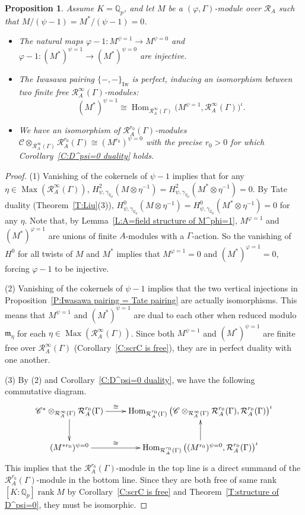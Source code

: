 \documentclass[12pt]{article}
\newtheorem{prop}[theorem]{Proposition}
\theoremstyle{definition}
\numberwithin{equation}{theorem}
\newcommand{\calR}{\mathcal{R}}
\newcommand{\gothm}{\mathfrak{m}}
\newcommand{\QQ}{\mathbb{Q}}
\newcommand{\scrC}{\mathscr{C}}
\newcommand{\Iw}{\mathrm{Iw}}
\def\Qp{\QQ_p}
\DeclareMathOperator{\Hom}{Hom}
\DeclareMathOperator{\Max}{Max}
\DeclareMathOperator{\rank}{rank}
\begin{document}
\begin{prop}
\label{P:Iwasawa pairing over fields}
Assume $K=\Qp$, and let $M$ be a $(\varphi, \Gamma)$-module over
$\calR_A$ such that $M / (\psi -1) = M^*/(\psi-1) = 0$.
\begin{itemize}
\item[(1)] The natural maps $\varphi-1: M^{\psi=1} \to M^{\psi=0}$ and $\varphi-1: (M^*)^{\psi=1} \to (M^*)^{\psi=0}$ are injective.
\item[(2)] The Iwasawa pairing $\{-,-\}_\Iw$ is perfect, inducing an isomorphism between two finite free $\calR_A^\infty(\Gamma)$-modules:
\[
(M^*)^{\psi =1} \cong \Hom_{\calR_A^\infty(\Gamma)}
\big(M^{\psi=1}, \calR_A^\infty(\Gamma) \big)^\iota.
\]
\item[(3)] We have an isomorphism of $\calR_A^{r_0}(\Gamma)$-modules $\scrC \otimes_{\calR_A^\infty(\Gamma)} \calR_A^{r_0}(\Gamma) \cong (M^{r_0})^{\psi=0}$ with the precise $r_0>0$ for which Corollary~\ref{C:D^psi=0 duality} holds.
\end{itemize}
\end{prop}
\begin{proof}
(1) Vanishing of the cokernels of $\psi-1$ implies that for any $\eta
  \in \Max(\calR_A^\infty(\Gamma))$, $H^2_{\psi,
    \gamma_{\Qp}}(M\otimes \eta^{-1}) = H^2_{\psi,
    \gamma_{\Qp}}(M^*\otimes \eta^{-1}) =0$.  By Tate duality
  (Theorem~\ref{T:Liu}(3)), $H^0_{\psi, \gamma_{\Qp}}(M\otimes
  \eta^{-1}) = H^0_{\psi, \gamma_{\Qp}}(M^*\otimes \eta^{-1}) =0$ for
  any $\eta$.  Note that, by Lemma~\ref{L:A=field structure of
    M^phi=1}, $M^{\varphi=1}$ and $(M^{*})^{\varphi=1}$ are unions of
  finite $A$-modules with a $\Gamma$-action.  So the vanishing of
  $H^0$ for all twists of $M$ and $M^*$ implies that $M^{\varphi=1}=0$
  and $(M^*)^{\varphi=1}=0$, forcing $\varphi-1$ to be injective.

(2) Vanishing of the cokernels of $\psi-1$ implies that the two
vertical injections in Proposition~\ref{P:Iwasawa pairing = Tate
  pairing} are actually isomorphisms.  This means that $M^{\psi=1}$
and $(M^*)^{\psi=1}$ are dual to each other when reduced modulo
$\gothm_\eta$ for each $\eta \in \Max(\calR_A^\infty(\Gamma))$.  Since
both $M^{\psi=1}$ and $(M^*)^{\psi=1}$ are finite free over
$\calR_A^\infty(\Gamma)$ (Corollary~\ref{C:scrC is free}), they are in
perfect duality with one another.

(3) By (2) and Corollary~\ref{C:D^psi=0 duality}, we have the following commutative diagram.
\[
\xymatrix{
\scrC^*\otimes_{\calR_A^\infty(\Gamma)} \calR_A^{r_0}(\Gamma) \ar[r]^-{\cong} \ar[d]& \Hom_{\calR_A^{r_0}(\Gamma)}\big(\scrC \otimes_{\calR_A^\infty(\Gamma)} \calR_A^{r_0}(\Gamma), \calR_A^{r_0}(\Gamma) \big)^\iota\\
(M^{*r_0})^{\psi=0} \ar[r]^-\cong &
\Hom_{\calR_A^{r_0}(\Gamma)}\big( (M^{r_0})^{\psi=0},\calR_A^{r_0}(\Gamma) \big)^\iota \ar[u]
}
\]
This implies that the $\calR_A^{r_0}(\Gamma)$-module in the top line is a direct summand of the $\calR_A^{r_0}(\Gamma)$-module in the bottom line.  Since they are both free of same rank $[K:\Qp]\rank M$ by Corollary~\ref{C:scrC is free} and Theorem~\ref{T:structure of D^psi=0}, they must be isomorphic.
\end{proof}
\end{document}
